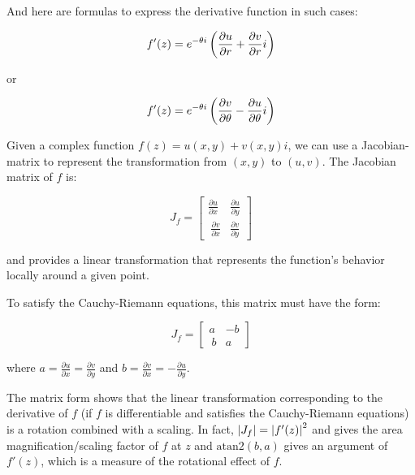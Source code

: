 \documentclass{article}
\begin{document}
And here are formulas to express the derivative function in such cases:

\[ f'(z) = e^{-\theta i}\left(\frac{\partial u}{\partial r} + \frac{\partial v}{\partial r}i\right) \]

or

\[ f'(z) = e^{-\theta i}\left(\frac{\partial v}{\partial \theta} - \frac{\partial u}{\partial \theta}i\right) \]

Given a complex function $f(z) = u(x,y) + v(x,y)i$, we can use a \@{Jacobian-matrix} to represent the transformation from $(x,y)$ to $(u,v)$. The Jacobian matrix of $f$ is:

\[ J_f = \begin{bmatrix} \frac{\partial u}{\partial x} & \frac{\partial u}{\partial y} \\\ \frac{\partial v}{\partial x} & \frac{\partial v}{\partial y} \end{bmatrix} \]

and provides a linear transformation that represents the function's behavior locally around a given point.

To satisfy the Cauchy-Riemann equations, this matrix must have the form:

\[ J_f = \begin{bmatrix} a & -b \\\ b & a \end{bmatrix} \]

where $a = \frac{\partial u}{\partial x} = \frac{\partial v}{\partial y}$ and $b = \frac{\partial v}{\partial x} = -\frac{\partial u}{\partial y}$.

The matrix form shows that the linear transformation corresponding to the derivative of $f$ (if $f$ is differentiable and satisfies the Cauchy-Riemann equations) is a rotation combined with a scaling. In fact, $\left| J_f \right| = \left| f'(z) \right|^2$ and gives the area magnification/scaling factor of $f$ at $z$ and $\text{atan2}(b,a)$ gives an argument of $f'(z)$, which is a measure of the rotational effect of $f$.
\end{document}
